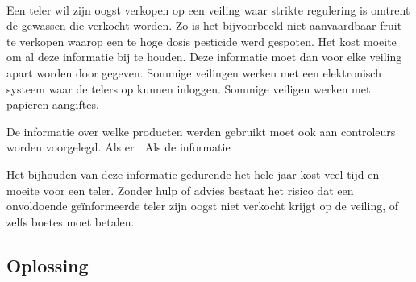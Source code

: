 \paragraph {} Een teler wil zijn oogst verkopen op een veiling waar strikte regulering is
omtrent de gewassen die verkocht worden. Zo is het bijvoorbeeld niet aanvaardbaar fruit te
verkopen waarop een te hoge dosis pesticide werd gespoten. Het kost moeite om al deze
informatie bij te houden. Deze informatie moet dan voor elke veiling apart worden door
gegeven. Sommige veilingen werken met een elektronisch systeem waar de telers op kunnen
inloggen. Sommige veiligen werken met papieren aangiftes.

De informatie over welke producten werden gebruikt moet ook aan controleurs worden
voorgelegd. Als er 
Als de informatie 

Het bijhouden van deze
informatie gedurende het hele jaar kost veel tijd en moeite voor een teler. Zonder hulp of
advies bestaat het risico dat een onvoldoende geïnformeerde teler zijn oogst niet verkocht
krijgt op de veiling, of zelfs boetes moet betalen.


\subsection {Oplossing}

